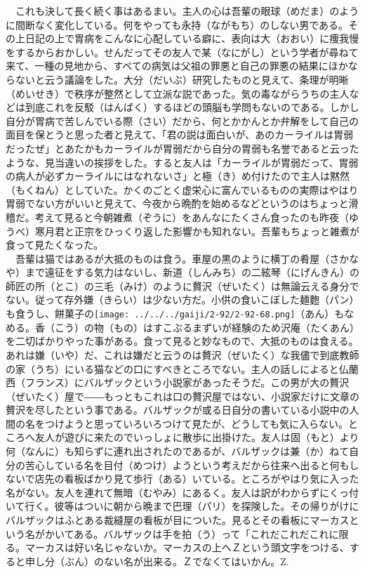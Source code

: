 　これも決して長く続く事はあるまい。主人の心は吾輩の眼球（めだま）のように間断なく変化している。何をやっても永持（ながもち）のしない男である。その上日記の上で胃病をこんなに心配している癖に、表向は大（おおい）に痩我慢をするからおかしい。せんだってその友人で某（なにがし）という学者が尋ねて来て、一種の見地から、すべての病気は父祖の罪悪と自己の罪悪の結果にほかならないと云う議論をした。大分（だいぶ）研究したものと見えて、条理が明晰（めいせき）で秩序が整然として立派な説であった。気の毒ながらうちの主人などは到底これを反駁（はんばく）するほどの頭脳も学問もないのである。しかし自分が胃病で苦しんでいる際（さい）だから、何とかかんとか弁解をして自己の面目を保とうと思った者と見えて、「君の説は面白いが、あのカーライルは胃弱だったぜ」とあたかもカーライルが胃弱だから自分の胃弱も名誉であると云ったような、見当違いの挨拶をした。すると友人は「カーライルが胃弱だって、胃弱の病人が必ずカーライルにはなれないさ」と極（き）め付けたので主人は黙然（もくねん）としていた。かくのごとく虚栄心に富んでいるものの実際はやはり胃弱でない方がいいと見えて、今夜から晩酌を始めるなどというのはちょっと滑稽だ。考えて見ると今朝雑煮（ぞうに）をあんなにたくさん食ったのも昨夜（ゆうべ）寒月君と正宗をひっくり返した影響かも知れない。吾輩もちょっと雑煮が食って見たくなった。\\
　吾輩は猫ではあるが大抵のものは食う。車屋の黒のように横丁の肴屋（さかなや）まで遠征をする気力はないし、新道（しんみち）の二絃琴（にげんきん）の師匠の所（とこ）の三毛（みけ）のように贅沢（ぜいたく）は無論云える身分でない。従って存外嫌（きらい）は少ない方だ。小供の食いこぼした麺麭（パン）も食うし、餅菓子の\texttt{[image: ../../../gaiji/2-92/2-92-68.png]}（あん）もなめる。香（こう）の物（もの）はすこぶるまずいが経験のため沢庵（たくあん）を二切ばかりやった事がある。食って見ると妙なもので、大抵のものは食える。あれは嫌（いや）だ、これは嫌だと云うのは贅沢（ぜいたく）な我儘で到底教師の家（うち）にいる猫などの口にすべきところでない。主人の話しによると仏蘭西（フランス）にバルザックという小説家があったそうだ。この男が大の贅沢（ぜいたく）屋で――もっともこれは口の贅沢屋ではない、小説家だけに文章の贅沢を尽したという事である。バルザックが或る日自分の書いている小説中の人間の名をつけようと思っていろいろつけて見たが、どうしても気に入らない。ところへ友人が遊びに来たのでいっしょに散歩に出掛けた。友人は固（もと）より何（なんに）も知らずに連れ出されたのであるが、バルザックは兼（か）ねて自分の苦心している名を目付（めつけ）ようという考えだから往来へ出ると何もしないで店先の看板ばかり見て歩行（ある）いている。ところがやはり気に入った名がない。友人を連れて無暗（むやみ）にあるく。友人は訳がわからずにくっ付いて行く。彼等はついに朝から晩まで巴理（パリ）を探険した。その帰りがけにバルザックはふとある裁縫屋の看板が目についた。見るとその看板にマーカスという名がかいてある。バルザックは手を拍（う）って「これだこれだこれに限る。マーカスは好い名じゃないか。マーカスの上へＺという頭文字をつける、すると申し分（ぶん）のない名が出来る。Ｚでなくてはいかん。Z.
